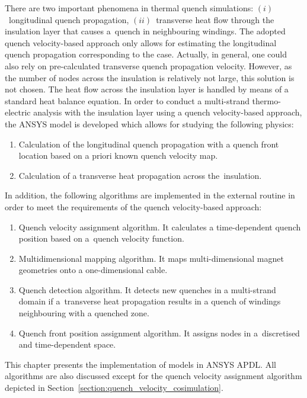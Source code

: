 
There are two important phenomena in thermal quench simulations: $(i)$~longitudinal quench propagation, $(ii)$~transverse heat flow through the insulation layer that causes a~quench in neighbouring windings. The adopted quench velocity-based approach only allows for estimating the longitudinal quench propagation corresponding to the  case. Actually, in general, one could also rely on pre-calculated transverse quench propagation velocity. However, as the number of nodes across the insulation is relatively not large, this solution is not chosen. The heat flow across the insulation layer is handled by means of a standard heat balance equation. In order to conduct a multi-strand thermo-electric analysis with the insulation layer using a quench velocity-based approach, the ANSYS model is developed which allows for studying the following physics: 

\begin{enumerate}
    \item Calculation of the longitudinal quench propagation with a quench front location based on a priori known quench velocity map.
    \item Calculation of a transverse heat propagation across the~insulation.
\end{enumerate}

In addition, the following algorithms are implemented in the external routine in order to meet the requirements of the quench velocity-based approach:

\begin{enumerate}
    \item Quench velocity assignment algorithm. It calculates a time-dependent quench position based on a~quench velocity function.
    \item Multidimensional mapping algorithm. It maps multi-dimensional magnet geometries onto a one-dimensional cable.
    \item Quench detection algorithm. It detects new quenches in a multi-strand domain if a~transverse heat propagation results in a quench of windings neighbouring with a quenched zone.
    \item Quench front position assignment algorithm. It assigns nodes in a~discretised and time-dependent space.
\end{enumerate}

This chapter presents the implementation of models in ANSYS APDL. All algorithms are also discussed except for the quench velocity assignment algorithm depicted in Section~\ref{section:quench_velocity_cosimulation}.